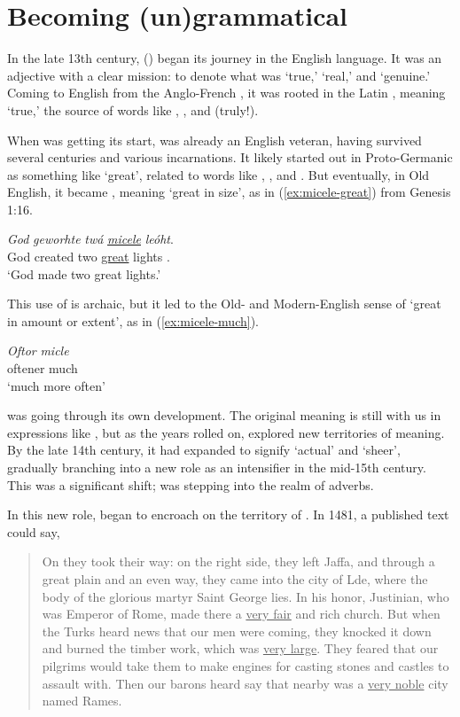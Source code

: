 \chapter{Becoming (un)grammatical}

In the late 13th century,  () began its journey in the English language. It was an adjective with a clear mission: to denote what was `true,' `real,' and `genuine.' Coming to English from the Anglo-French , it was rooted in the Latin , meaning `true,' the source of words like , , and  (truly!).

When  was getting its start,  was already an English veteran, having survived several centuries and various incarnations. It likely started out in Proto-Germanic as something like   `great', related to words like , , and . But eventually, in Old English, it became , meaning `great in size', as in (\ref{ex:micele-great}) from Genesis 1:16.

\ea\label{ex:micele-great}
  \gll \textit{God} \textit{geworhte} \textit{twá} \uline{\textit{micele}} \textit{leóht}.\\
       God created two \uline{great} lights .\\
  \trans `God made two great lights.'
\z

This use of  is archaic, but it led to the Old- and Modern-English sense of `great in amount or extent', as in (\ref{ex:micele-much}).

\ea\label{ex:micele-much}
  \gll \textit{Oftor} \textit{micle}\\
       oftener much\\
  \trans `much more often'
\z

 was going through its own development. The original meaning is still with us in expressions like , but as the years rolled on,  explored new territories of meaning. By the late 14th century, it had expanded to signify `actual' and `sheer', gradually branching into a new role as an intensifier in the mid-15th century. This was a significant shift;  was stepping into the realm of adverbs.

In this new role,  began to encroach on the territory of . In 1481, a published text could say,
\begin{quote}
    On they took their way: on the right side, they left Jaffa, and through a great plain and an even way, they came into the city of Lde, where the body of the glorious martyr Saint George lies. In his honor, Justinian, who was Emperor of Rome, made there a \uline{very fair} and rich church. But when the Turks heard news that our men were coming, they knocked it down and burned the timber work, which was \uline{very large}. They feared that our pilgrims would take them to make engines for casting stones and castles to assault with. Then our barons heard say that nearby was a \uline{very noble} city named Rames.
\end{quote}

